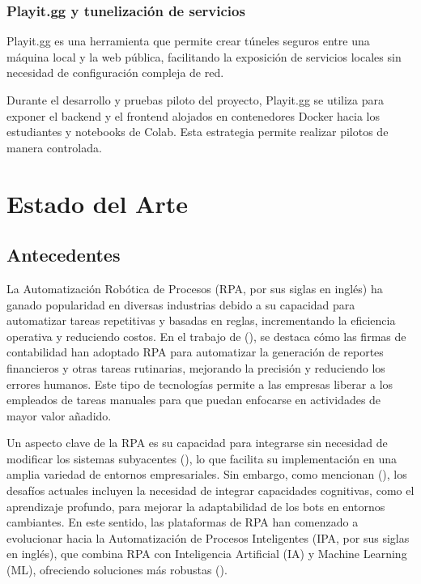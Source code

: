 \documentclass[letter,oneside,12pt,spanish]{report}
\begin{document}
\subsection{Playit.gg y tunelización de servicios}

Playit.gg es una herramienta que permite crear túneles seguros entre una máquina local y la web pública, facilitando la exposición de servicios locales sin necesidad de configuración compleja de red.

Durante el desarrollo y pruebas piloto del proyecto, Playit.gg se utiliza para exponer el backend y el frontend alojados en contenedores Docker hacia los estudiantes y notebooks de Colab. Esta estrategia permite realizar pilotos de manera controlada.


\newpage


\chapter{Estado del Arte}

\section{Antecedentes}

\noindent La Automatización Robótica de Procesos (RPA, por sus siglas en inglés) ha ganado popularidad en diversas industrias debido a su capacidad para automatizar tareas repetitivas y basadas en reglas, incrementando la eficiencia operativa y reduciendo costos. En el trabajo de (\cite{cooper2019rpa}), se destaca cómo las firmas de contabilidad han adoptado RPA para automatizar la generación de reportes financieros y otras tareas rutinarias, mejorando la precisión y reduciendo los errores humanos. Este tipo de tecnologías permite a las empresas liberar a los empleados de tareas manuales para que puedan enfocarse en actividades de mayor valor añadido.

\noindent Un aspecto clave de la RPA es su capacidad para integrarse sin necesidad de modificar los sistemas subyacentes (\cite{aalst2018bpm}), lo que facilita su implementación en una amplia variedad de entornos empresariales. Sin embargo, como mencionan (\cite{syed2020rpa}), los desafíos actuales incluyen la necesidad de integrar capacidades cognitivas, como el aprendizaje profundo, para mejorar la adaptabilidad de los bots en entornos cambiantes. En este sentido, las plataformas de RPA han comenzado a evolucionar hacia la Automatización de Procesos Inteligentes (IPA, por sus siglas en inglés), que combina RPA con Inteligencia Artificial (IA) y Machine Learning (ML), ofreciendo soluciones más robustas (\cite{gami2019ipa}).
\end{document}
